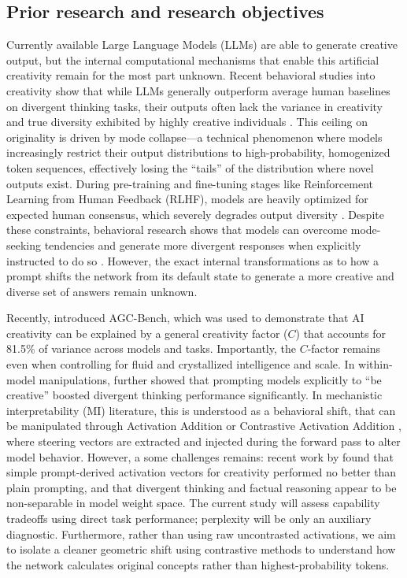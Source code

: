 \documentclass{article}
\begin{document}
\subsection{Prior research and research objectives}
Currently available Large Language Models (LLMs) are able to generate creative output, but the internal computational mechanisms that enable this artificial creativity remain for the most part unknown. Recent behavioral studies into creativity show that while LLMs generally outperform average human baselines on divergent thinking tasks, their outputs often lack the variance in creativity and true diversity exhibited by highly creative individuals \parencite{moon2025homogenizing, haase2025has}. This ceiling on originality is driven by mode collapse—a technical phenomenon where models increasingly restrict their output distributions to high-probability, homogenized token sequences, effectively losing the ``tails'' of the distribution where novel outputs exist. During pre-training and fine-tuning stages like Reinforcement Learning from Human Feedback (RLHF), models are heavily optimized for expected human consensus, which severely degrades output diversity \parencite{kirk2024understanding, shumailov2024curse}. Despite these constraints, behavioral research shows that models can overcome mode-seeking tendencies and generate more divergent responses when explicitly instructed to do so \parencite{beaty2026agc, tian2024thinking}. However, the exact internal transformations as to how a prompt shifts the network from its default state to generate a more creative and diverse set of answers remain unknown. 

Recently, \textcite{beaty2026agc} introduced AGC-Bench, which was used to demonstrate that AI creativity can be explained by a general creativity factor ($C$) that accounts for 81.5\% of variance across models and tasks. Importantly, the $C$-factor remains even when controlling for fluid and crystallized intelligence and scale. In within-model manipulations, \textcite{beaty2026agc} further showed that prompting models explicitly to ``be creative'' boosted divergent thinking performance significantly. In mechanistic interpretability (MI) literature, this is understood as a behavioral shift, that can be manipulated through Activation Addition \parencite{turner2023activation} or Contrastive Activation Addition \parencite{rimsky2024steering}, where steering vectors are extracted and injected during the forward pass to alter model behavior. However, a some challenges remains: recent work by \textcite{schapiro2026assessing} found that simple prompt-derived activation vectors for creativity performed no better than plain prompting, and that divergent thinking and factual reasoning appear to be non-separable in model weight space. The current study will assess capability tradeoffs using direct task performance; perplexity will be only an auxiliary diagnostic. Furthermore, rather than using raw uncontrasted activations, we aim to isolate a cleaner geometric shift using contrastive methods to understand how the network calculates original concepts rather than highest-probability tokens.
\end{document}
